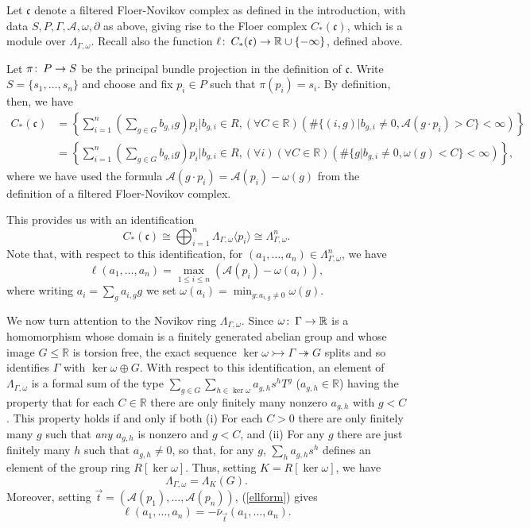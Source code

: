 \documentclass{amsart}
\theoremstyle{plain}
\theoremstyle{definition}
\theoremstyle{remark}
\def\co{\colon\thinspace}
\def\barnu{\bar{\nu}}
\begin{document}
Let $\mathfrak{c}$ denote a filtered Floer-Novikov complex as defined in the introduction, with data $S,P,\Gamma,\mathcal{A},\omega,\partial$ as above, giving rise to the Floer complex $C_*(\mathfrak{c})$, which is a module over $\Lambda_{\Gamma,\omega}$. Recall also the function $\ell\co C_*(\mathfrak{c})\to \mathbb{R}\cup\{-\infty\}$, defined above. 

Let $\pi\co P\to S$ be the principal bundle projection in the definition of $\mathfrak{c}$.  Write $S=\{s_1,\ldots,s_n\}$ and choose and fix $p_i\in P$ such that $\pi(p_i)=s_i$.  By definition, then, we have \begin{align*}
C_*(\mathfrak{c})&=\left\{\sum_{i=1}^{n}\left(\sum_{g\in G} b_{g,i}g\right)p_i|b_{g,i}\in R,(\forall C\in\mathbb{R})(\#\{(i,g)|b_{g,i}\neq 0,\mathcal{A}(g\cdot p_i)>C\}<\infty)\right\} \\
& = \left\{\sum_{i=1}^{n}\left(\sum_{g\in G} b_{g,i}g\right)p_i|b_{g,i}\in R,(\forall i)(\forall C\in\mathbb{R})(\#\{g|b_{g,i}\neq 0, \omega(g)<C\}<\infty)\right\}, \end{align*} where we have used the formula $\mathcal{A}(g\cdot p_i)=\mathcal{A}(p_i)-\omega(g)$ from the definition of a filtered Floer-Novikov complex.

This provides us with an identification
\begin{equation}\label{cstar} C_*(\mathfrak{c})\cong\bigoplus_{i=1}^{n}\Lambda_{\Gamma,\omega}\langle p_i \rangle\cong \Lambda_{\Gamma,\omega}^n.\end{equation}  Note that, with respect to this identification, for $(a_1,\ldots,a_n)\in \Lambda_{\Gamma,\omega}^n$, we have \begin{equation}\label{ellform} \ell(a_1,\ldots,a_n)=\max_{1\leq i\leq n}(\mathcal{A}(p_i)-\omega(a_i)),\end{equation} where writing $a_i=\sum_ga_{i,g}g$ we set $\omega(a_i)=\min_{g:a_{i,g}\neq 0}\omega(g).$

We now turn attention to the Novikov ring $\Lambda_{\Gamma,\omega}$.  Since $\omega\co \Gamma\to\mathbb{R}$ is a homomorphism whose domain is a finitely generated abelian group and whose image $G\leq \mathbb{R}$ is torsion free,  the exact sequence $\ker\omega\rightarrowtail\Gamma\twoheadrightarrow  G$ splits and so identifies $\Gamma$ with $\ker\omega\oplus G$.  With respect to this identification, an element of $\Lambda_{\Gamma,\omega}$ is a formal sum of the type $\sum_{g\in G}\sum_{h\in \ker \omega}a_{g,h}s^hT^g$ ($a_{g,h}\in\mathbb{R}$) having the property that for each $C\in\mathbb{R}$ there are only finitely many nonzero $a_{g,h}$ with $g< C$.  This property holds if and only if both (i) For each $C>0$ there are only finitely many $g$ such that \emph{any} $a_{g,h}$ is nonzero and $g<C$, and (ii) For any $g$ there are just finitely many $h$ such that $a_{g,h}\neq 0$, so that, for any $g$, $\sum_h a_{g,h}s^h$ defines an element of the group ring $R[\ker\omega]$.  Thus, setting $K=R[\ker\omega]$, we have \[ \Lambda_{\Gamma,\omega}=\Lambda_K(G).\]  Moreover, setting $\vec{t}=(\mathcal{A}(p_1),\ldots,\mathcal{A}(p_n))$, (\ref{ellform}) gives \[ \ell(a_1,\ldots,a_n)=-\barnu_{\vec{t}}(a_1,\ldots,a_n).\]
\end{document}

